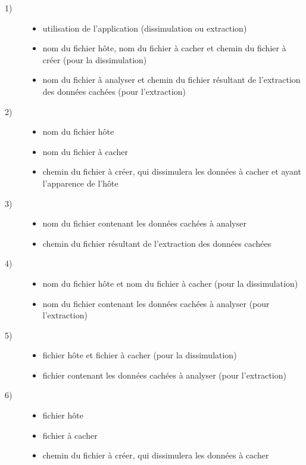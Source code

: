 \documentclass[11pt]{article}
\begin{document}
\small
\begin{description}
\item[1)] 
\begin{itemize}
\item utilisation de l'application (dissimulation ou extraction)
\item nom du fichier hôte, nom du fichier à cacher et chemin du fichier à créer (pour la dissimulation)
\item nom du fichier à analyser et chemin du fichier résultant de l'extraction des données cachées (pour l'extraction)
\end{itemize}
\item[2)] 
\begin{itemize}
\item nom du fichier hôte 
\item nom du fichier à cacher 
\item chemin du fichier à créer, qui dissimulera les données à cacher et ayant l'apparence de l'hôte
\end{itemize}
\item[3)] 
\begin{itemize}
\item nom du fichier contenant les données cachées à analyser
\item chemin du fichier résultant de l'extraction des données cachées
\end{itemize}
\item[4)] 
\begin{itemize}
\item nom du fichier hôte et nom du fichier à cacher (pour la dissimulation)
\item nom du fichier contenant les données cachées à analyser (pour l'extraction)
\end{itemize}
\item[5)]
\begin{itemize}
\item fichier hôte et fichier à cacher (pour la dissimulation)
\item fichier contenant les données cachées à analyser (pour l'extraction)
\end{itemize}
\item[6)]
\begin{itemize}
\item fichier hôte 
\item fichier à cacher 
\item chemin du fichier à créer, qui dissimulera les données à cacher
\end{itemize}

\end{description}
\end{document}
